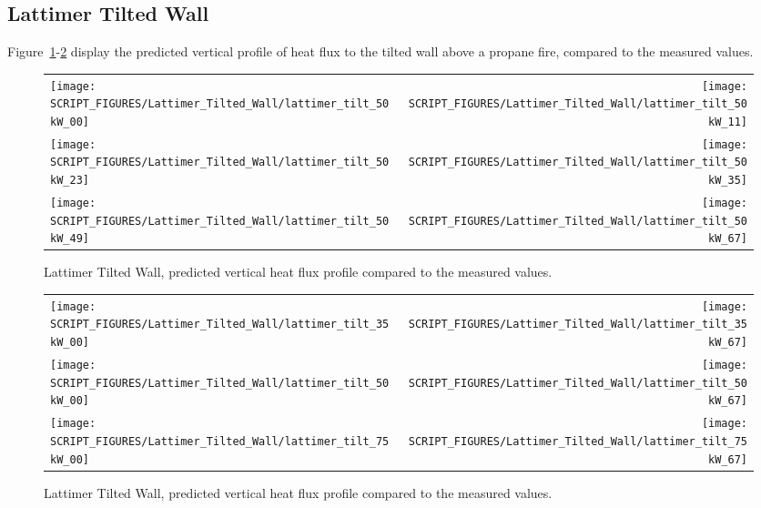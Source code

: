 \clearpage

\subsection{Lattimer Tilted Wall}

Figure~\ref{Lattimer_Tilted_Wall_Heat_Flux1}-\ref{Lattimer_Tilted_Wall_Heat_Flux2} display the predicted vertical profile of heat flux to the tilted wall above a propane fire, compared to the measured values.

\begin{figure}[p]
\begin{tabular*}{\textwidth}{l@{\extracolsep{\fill}}r}
\texttt{[image: SCRIPT\_FIGURES/Lattimer\_Tilted\_Wall/lattimer\_tilt\_50kW\_00]} &
\texttt{[image: SCRIPT\_FIGURES/Lattimer\_Tilted\_Wall/lattimer\_tilt\_50kW\_11]} \\
\texttt{[image: SCRIPT\_FIGURES/Lattimer\_Tilted\_Wall/lattimer\_tilt\_50kW\_23]} &
\texttt{[image: SCRIPT\_FIGURES/Lattimer\_Tilted\_Wall/lattimer\_tilt\_50kW\_35]} \\
\texttt{[image: SCRIPT\_FIGURES/Lattimer\_Tilted\_Wall/lattimer\_tilt\_50kW\_49]} &
\texttt{[image: SCRIPT\_FIGURES/Lattimer\_Tilted\_Wall/lattimer\_tilt\_50kW\_67]}
\end{tabular*}
\caption[Lattimer Tilted Wall, heat flux to the wall]{Lattimer Tilted Wall, predicted vertical heat flux profile compared to the measured values.}
\label{Lattimer_Tilted_Wall_Heat_Flux1}
\end{figure}

\begin{figure}[p]
\begin{tabular*}{\textwidth}{l@{\extracolsep{\fill}}r}
\texttt{[image: SCRIPT\_FIGURES/Lattimer\_Tilted\_Wall/lattimer\_tilt\_35kW\_00]} &
\texttt{[image: SCRIPT\_FIGURES/Lattimer\_Tilted\_Wall/lattimer\_tilt\_35kW\_67]} \\
\texttt{[image: SCRIPT\_FIGURES/Lattimer\_Tilted\_Wall/lattimer\_tilt\_50kW\_00]} &
\texttt{[image: SCRIPT\_FIGURES/Lattimer\_Tilted\_Wall/lattimer\_tilt\_50kW\_67]} \\
\texttt{[image: SCRIPT\_FIGURES/Lattimer\_Tilted\_Wall/lattimer\_tilt\_75kW\_00]} &
\texttt{[image: SCRIPT\_FIGURES/Lattimer\_Tilted\_Wall/lattimer\_tilt\_75kW\_67]}
\end{tabular*}
\caption[Lattimer Tilted Wall, heat flux to the wall]{Lattimer Tilted Wall, predicted vertical heat flux profile compared to the measured values.}
\label{Lattimer_Tilted_Wall_Heat_Flux2}
\end{figure}

